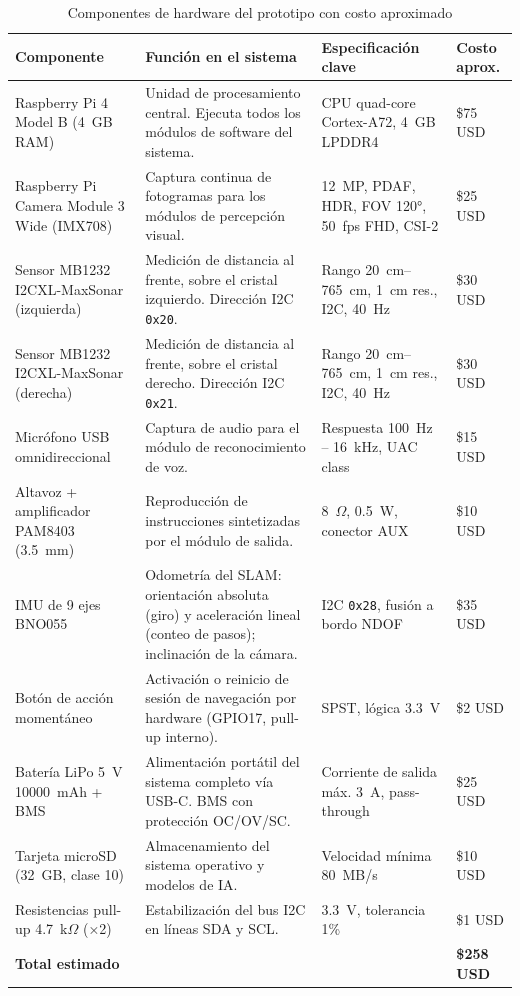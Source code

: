 \begin{longtable}{p{4.2cm} p{4.5cm} p{2.8cm} p{1.8cm}}
\caption{Componentes de hardware del prototipo con costo aproximado}
\label{tabla_hardware} \\
\hline
\textbf{Componente} & \textbf{Función en el sistema}
    & \textbf{Especificación clave} & \textbf{Costo aprox.} \\
\hline
Raspberry Pi 4 Model B (4~GB RAM)
    & Unidad de procesamiento central. Ejecuta todos los módulos de software del sistema.
    & CPU quad-core Cortex-A72, 4~GB LPDDR4
    & \$75 USD \\
\hline
Raspberry Pi Camera Module 3 Wide (IMX708)
    & Captura continua de fotogramas para los módulos de percepción visual.
    & 12~MP, PDAF, HDR, FOV 120°, 50~fps FHD, CSI-2
    & \$25 USD \\
\hline
Sensor MB1232 I2CXL-MaxSonar (izquierda)
    & Medición de distancia al frente, sobre el cristal izquierdo. Dirección I2C
    \texttt{0x20}.
    & Rango 20~cm--765~cm, 1~cm res., I2C, 40~Hz
    & \$30 USD \\
\hline
Sensor MB1232 I2CXL-MaxSonar (derecha)
    & Medición de distancia al frente, sobre el cristal derecho. Dirección I2C
    \texttt{0x21}.
    & Rango 20~cm--765~cm, 1~cm res., I2C, 40~Hz
    & \$30 USD \\
\hline
Micrófono USB omnidireccional
    & Captura de audio para el módulo de reconocimiento de voz.
    & Respuesta 100~Hz -- 16~kHz, UAC class
    & \$15 USD \\
\hline
Altavoz + amplificador PAM8403 (3.5~mm)
    & Reproducción de instrucciones sintetizadas por el módulo de salida.
    & 8~$\Omega$, 0.5~W, conector AUX
    & \$10 USD \\
\hline
IMU de 9 ejes BNO055
    & Odometría del SLAM: orientación absoluta (giro) y aceleración lineal (conteo de
      pasos); inclinación de la cámara.
    & I2C \texttt{0x28}, fusión a bordo NDOF
    & \$35 USD \\
\hline
Botón de acción momentáneo
    & Activación o reinicio de sesión de navegación por hardware (GPIO17, pull-up interno).
    & SPST, lógica 3.3~V
    & \$2 USD \\
\hline
Batería LiPo 5~V 10000~mAh + BMS
    & Alimentación portátil del sistema completo vía USB-C. BMS con protección OC/OV/SC.
    & Corriente de salida máx. 3~A, pass-through
    & \$25 USD \\
\hline
Tarjeta microSD (32~GB, clase 10)
    & Almacenamiento del sistema operativo y modelos de IA.
    & Velocidad mínima 80~MB/s
    & \$10 USD \\
\hline
Resistencias pull-up 4.7~k$\Omega$ (×2)
    & Estabilización del bus I2C en líneas SDA y SCL.
    & 3.3~V, tolerancia 1\%
    & \$1 USD \\
\hline
\textbf{Total estimado} & & & \textbf{\$258 USD} \\
\hline
\end{longtable}
